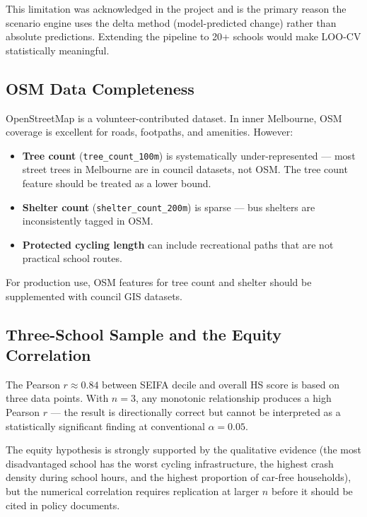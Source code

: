 \documentclass[11pt,a4paper,openany]{book}
\begin{document}
This limitation was acknowledged in the project and is the primary reason the scenario
engine uses the delta method (model-predicted change) rather than absolute predictions.
Extending the pipeline to 20+ schools would make LOO-CV statistically meaningful.

\subsection{OSM Data Completeness}

OpenStreetMap is a volunteer-contributed dataset.  In inner Melbourne, OSM coverage is
excellent for roads, footpaths, and amenities.  However:

\begin{itemize}
  \item \textbf{Tree count} (\texttt{tree\_count\_100m}) is systematically
    under-represented --- most street trees in Melbourne are in council datasets, not OSM.
    The tree count feature should be treated as a lower bound.
  \item \textbf{Shelter count} (\texttt{shelter\_count\_200m}) is sparse --- bus shelters
    are inconsistently tagged in OSM.
  \item \textbf{Protected cycling length} can include recreational paths that are not
    practical school routes.
\end{itemize}

For production use, OSM features for tree count and shelter should be supplemented with
council GIS datasets.

\subsection{Three-School Sample and the Equity Correlation}

The Pearson $r \approx 0.84$ between SEIFA decile and overall HS score is based on three
data points.  With $n = 3$, any monotonic relationship produces a high Pearson $r$ ---
the result is directionally correct but cannot be interpreted as a statistically
significant finding at conventional $\alpha = 0.05$.

The equity hypothesis is strongly supported by the qualitative evidence (the most
disadvantaged school has the worst cycling infrastructure, the highest crash density
during school hours, and the highest proportion of car-free households), but the
numerical correlation requires replication at larger $n$ before it should be cited
in policy documents.
\end{document}
